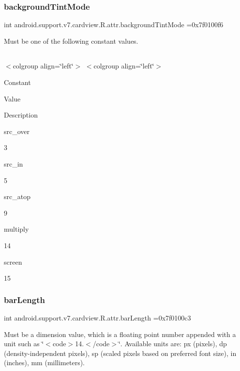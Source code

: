 \subsubsection{\texorpdfstring{background\+Tint\+Mode}{backgroundTintMode}}
{\footnotesize\ttfamily int android.\+support.\+v7.\+cardview.\+R.\+attr.\+background\+Tint\+Mode =0x7f0100f6\hspace{0.3cm}{\ttfamily [static]}}

Must be one of the following constant values.

\tabulinesep=1mm
\begin{longtabu} spread 0pt [c]{*{0}{|X[-1]}|}
\hline
\end{longtabu}
$<$colgroup align=\char`\"{}left\char`\"{}$>$ $<$colgroup align=\char`\"{}left\char`\"{}$>$ 

Constant

Value

Description 

{\ttfamily src\+\_\+over}

3

{\ttfamily src\+\_\+in}

5

{\ttfamily src\+\_\+atop}

9

{\ttfamily multiply}

14

{\ttfamily screen}

15\mbox{\label{classandroid_1_1support_1_1v7_1_1cardview_1_1R_1_1attr_a2ce9b99838a2d58ce2c820ccd5920e63}} 
\subsubsection{\texorpdfstring{bar\+Length}{barLength}}
{\footnotesize\ttfamily int android.\+support.\+v7.\+cardview.\+R.\+attr.\+bar\+Length =0x7f0100c3\hspace{0.3cm}{\ttfamily [static]}}

Must be a dimension value, which is a floating point number appended with a unit such as \char`\"{}$<$code$>$14.\+5sp$<$/code$>$\char`\"{}. Available units are\+: px (pixels), dp (density-\/independent pixels), sp (scaled pixels based on preferred font size), in (inches), mm (millimeters). 

